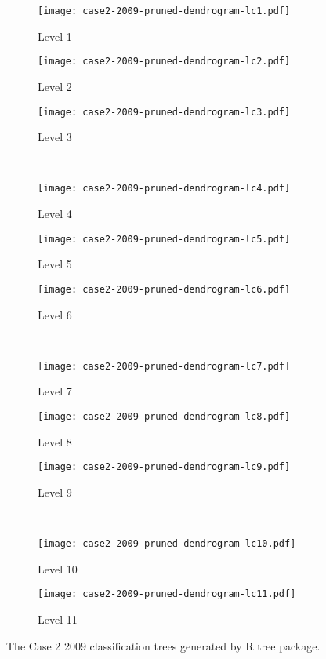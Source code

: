 \begin{appendices}

\begin{figure}[!ht] \centering
	\captionsetup[subfigure]{width=2.0in}
	\begin{subfigure}[t]{0.32\textwidth}
		\texttt{[image: case2-2009-pruned-dendrogram-lc1.pdf]}
		\caption{Level 1}
	\end{subfigure}
	\begin{subfigure}[t]{0.32\textwidth}
		\texttt{[image: case2-2009-pruned-dendrogram-lc2.pdf]}
		\caption{Level 2}
	\end{subfigure}
	\begin{subfigure}[t]{0.32\textwidth}
		\texttt{[image: case2-2009-pruned-dendrogram-lc3.pdf]}
		\caption{Level 3}
	\end{subfigure}\\
	\vspace{5pt}
	\begin{subfigure}[t]{0.32\textwidth}
		\texttt{[image: case2-2009-pruned-dendrogram-lc4.pdf]}
		\caption{Level 4}
	\end{subfigure}
	\begin{subfigure}[t]{0.32\textwidth}
		\texttt{[image: case2-2009-pruned-dendrogram-lc5.pdf]}
		\caption{Level 5}
	\end{subfigure}
	\begin{subfigure}[t]{0.32\textwidth}
		\texttt{[image: case2-2009-pruned-dendrogram-lc6.pdf]}
		\caption{Level 6}
	\end{subfigure}\\
	\vspace{5pt}	
	\begin{subfigure}[t]{0.32\textwidth}
		\texttt{[image: case2-2009-pruned-dendrogram-lc7.pdf]}
		\caption{Level 7}
	\end{subfigure}
	\begin{subfigure}[t]{0.32\textwidth}
		\texttt{[image: case2-2009-pruned-dendrogram-lc8.pdf]}
		\caption{Level 8}
	\end{subfigure}
	\begin{subfigure}[t]{0.32\textwidth}
		\texttt{[image: case2-2009-pruned-dendrogram-lc9.pdf]}
		\caption{Level 9}
	\end{subfigure}\\
	\vspace{5pt}
	\begin{subfigure}[t]{0.32\textwidth}
		\texttt{[image: case2-2009-pruned-dendrogram-lc10.pdf]}
		\caption{Level 10}
	\end{subfigure}
	\begin{subfigure}[t]{0.32\textwidth}
		\texttt{[image: case2-2009-pruned-dendrogram-lc11.pdf]}
		\caption{Level 11}
	\end{subfigure}
	\vspace{5pt}
	\caption[The Case 2 2009 classification trees generated by R tree package.]{The Case 2 2009 classification trees generated by R tree package.}
	\label{fig: appendix-fig.c13.tree}
\end{figure}


\end{appendices}
